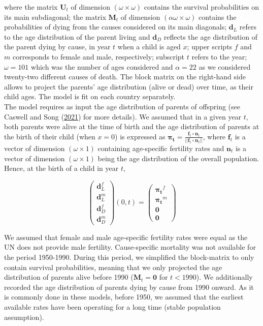 \documentclass[
  11pt,
  letterpaper,
]{article}
\begin{document}
where the matrix \(\boldsymbol{U}_t\) of dimension \((\omega \times \omega)\) contains the survival probabilities on its main subdiagonal; the matrix \(\boldsymbol{M}_t\) of dimension \((\alpha\omega \times \omega)\) contains the probabilities of dying from the causes considered on its main diagonals; \(\boldsymbol{d}_L\) refers to the age distribution of the parent living and \(\boldsymbol{d}_D\) reflects the age distribution of the parent dying by cause, in year \(t\) when a child is aged \(x\); upper scripts \(f\) and \(m\) corresponds to female and male, respectively; subscript \(t\) refers to the year; \(\omega=101\) which was the number of ages considered and \(\alpha=22\) as we considered twenty-two different causes of death. The block matrix on the right-hand side allows to project the parents' age distribution (alive or dead) over time, as their child ages. The model is fit on each country separately.\\
The model requires as input the age distribution of parents of offspring (see Caswell and Song (\protect\hyperlink{ref-caswell2021formal}{2021}) for more details). We assumed that in a given year \(t\), both parents were alive at the time of birth and the age distribution of parents at the birth of their child (when \(x=0\)) is expressed as \(\boldsymbol{\pi_t} = \frac{\boldsymbol{f}_t \circ \boldsymbol{n}_t}{||\boldsymbol{f}_t \circ \boldsymbol{n}_t||}\), where \(\boldsymbol{f}_t\) is a vector of dimension \((\omega \times 1)\) containing age-specific fertility rates and \(\boldsymbol{n}_t\) is a vector of dimension \((\omega \times 1)\) being the age distribution of the overall population. Hence, at the birth of a child in year \(t\),

\[\begin{pmatrix} \boldsymbol{d}^f_L \\ 
\boldsymbol{d}^m_L \\ 
\hline \boldsymbol{d}^f_D \\ 
\boldsymbol{d}^m_D 
\end{pmatrix}(0, t)
=
\begin{pmatrix} \boldsymbol{\pi_t}^f \\ 
\boldsymbol{\pi_t}^m \\ 
\hline \boldsymbol{0} \\ 
\boldsymbol{0} 
\end{pmatrix}
\]

We assumed that female and male age-specific fertility rates were equal as the UN does not provide male fertility.
Cause-specific mortality was not available for the period 1950-1990. During this period, we simplified the block-matrix to only contain survival probabilities, meaning that we only projected the age distribution of parents alive before 1990 (\(\boldsymbol{M}_t = \boldsymbol{0}\) for \(t < 1990\)). We additionally recorded the age distribution of parents dying by cause from 1990 onward. As it is commonly done in these models, before 1950, we assumed that the earliest available rates have been operating for a long time (stable population assumption).
\end{document}
